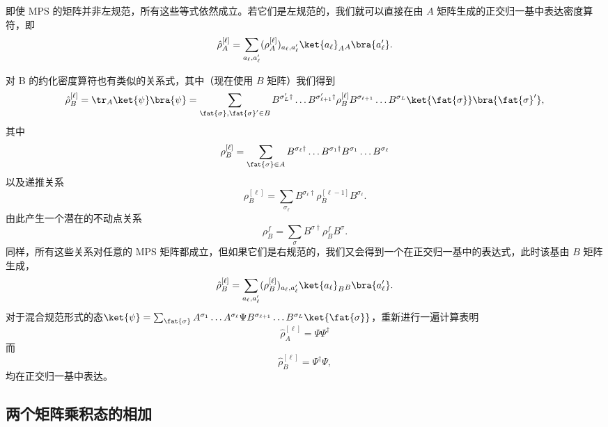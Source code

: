 即使 MPS 的矩阵并非左规范，所有这些等式依然成立。若它们是左规范的，我们就可以直接在由 $A$ 矩阵生成的正交归一基中表达密度算符，即
\begin{equation}
\hat{\rho}_A^{[\ell]} = \sum_{a_\ell, a'_\ell} (\rho_A^{[\ell]})_{a_\ell, a'_\ell} \ket{a_\ell}_A \phantom{{}}_A\bra{a'_\ell} .
\end{equation}

对 B 的约化密度算符也有类似的关系式，其中（现在使用 $B$ 矩阵）我们得到
\begin{equation}
\hat{\rho}_B^{[\ell]} = \tr_A \ket{\psi}\bra{\psi} = \sum_{\fat{\sigma},\fat{\sigma}'\in B} 
B^{\sigma'_L\dagger} \ldots B^{\sigma'_{\ell+1}\dagger} \rho_B^{[\ell]} B^{\sigma_{\ell+1}} \ldots B^{\sigma_L} \ket{\fat{\sigma}} \bra{\fat{\sigma}'} ,
\end{equation}
其中
\begin{equation}
\rho_B^{[\ell]} =  \sum_{\fat{\sigma}\in A} B^{\sigma_{\ell}\dagger} \ldots B^{\sigma_1\dagger} B^{\sigma_1} \ldots B^{\sigma_{\ell} }
\end{equation}
以及递推关系
\begin{equation}
\rho_B^{[\ell]} = \sum_{\sigma_\ell} B^{\sigma_\ell\dagger} \rho_B^{[\ell-1]} B^{\sigma_\ell} .
\label{eq:rhobrecursion}
\end{equation}
由此产生一个潜在的不动点关系
\begin{equation}
\rho_B^f = \sum_{\sigma} B^{\sigma\dagger} \rho_B^{f} B^{\sigma} .
\end{equation}
同样，所有这些关系对任意的 MPS 矩阵都成立，但如果它们是右规范的，我们又会得到一个在正交归一基中的表达式，此时该基由 $B$ 矩阵生成，
\begin{equation}
\hat{\rho}_B^{[\ell]} = \sum_{a_\ell, a'_\ell} (\rho_B^{[\ell]})_{a_\ell, a'_\ell} \ket{a_\ell}_B \phantom{{}}_B\bra{a'_\ell} .
\end{equation}
对于混合规范形式的态$\ket{\psi}=\sum_{\fat{\sigma}} A^{\sigma_1}\ldots A^{\sigma_\ell}\Psi B^{\sigma_{\ell+1}} \ldots B^{\sigma_L} \ket{\fat{\sigma}}$，重新进行一遍计算表明
\begin{equation}
\hat{\rho}^{[\ell]}_A = \Psi \Psi^\dagger
\end{equation}
而
\begin{equation}
\hat{\rho}^{[\ell]}_B = \Psi^\dagger\Psi ,
\end{equation}
均在正交归一基中表达。

\subsection{两个矩阵乘积态的相加}

